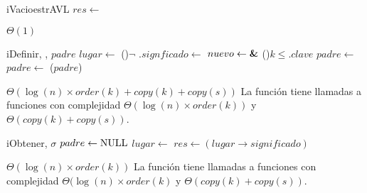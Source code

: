 \begin{Algoritmos}


  \begin{algoritmo}{iVacio}{}{estrAVL}
    $res \gets$ \nil{} 
  \end{algoritmo}
  \datosAlgoritmo{} %
  {} %
  {} %
  {$\Theta(1)$} %
  {} %

  \begin{algoritmo}{iDefinir}{, , }{}
     $padre$ \;
     $lugar \gets$  
    \eIf(){$\neg$ }{
      .$signficado \gets$  
    }{
       $nuevo \gets \textbf{\&}$   
      \eIf(){$k \leq $$.clave$}{
        $padre \gets$  
      }{
        $padre \gets$  
      }
      \rebalancear($padre$) 
    }
  \end{algoritmo}
  \datosAlgoritmo{} %
  {} %
  {} %
  {$\Theta(\log(n) \times order(k) + copy(k) + copy(s))$} %
  {La funci\'on tiene llamadas a funciones con complejidad $\Theta(\log(n) \times order(k))$ y $\Theta(copy(k) + copy(s))$.} %

  \begin{algoritmo}{iObtener}{, }{$\sigma$}
     $padre \gets \textrm{NULL}$ 
     $lugar \gets$  
    $res \gets (lugar \to significado)$ 
  \end{algoritmo}
  \datosAlgoritmo{} %
  {} %
  {} %
  {$\Theta(\log(n) \times order(k))$} %
  {La funci\'on tiene llamadas a funciones con complejidad $\Theta(\log(n) \times order(k)$ y $\Theta(copy(k) + copy(s))$.} %


\end{Algoritmos}
